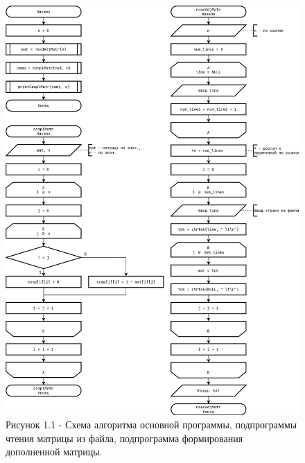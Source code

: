 \documentclass[oneside,a4paper,14pt]{extarticle}
\begin{document}
\clearpage
\begin{figure}[H]
	\centering
	\includegraphics[height=0.9\textheight]{pics/flowchart1.png}
	\caption*{Рисунок 1.1 - Схема алгоритма основной программы, подпрограммы чтения матрицы из файла, подпрограмма формирования дополненной матрицы.}
\end{figure}
\end{document}

